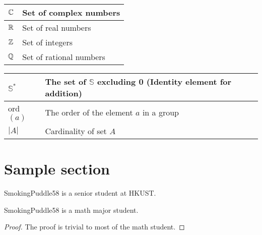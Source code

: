 \documentclass{article}
\begin{document}
\begin{center}

    \begin{tabular}{|l|l|}
        \hline
        $\mathbb{C}$ & Set of complex numbers \\ \hline
        $\mathbb{R}$ & Set of real numbers \\ \hline
        $\mathbb{Z}$ & Set of integers \\ \hline
        $\mathbb{Q}$ & Set of rational numbers \\ \hline
    \end{tabular}
\end{center}
\begin{center}
    
    \begin{tabular}{|l|l|}
        \hline
        $\mathbb{S}^{*}$ & The set of $\mathbb{S}$ excluding 0 (Identity element for addition) \\ \hline
        ord$(a)$                                       & The order of the element $a$ in a group \\ \hline
        $|A|$                                          & Cardinality of set $A$ \\
        \hline                                                           
    \end{tabular}

\end{center}


\newpage

\tableofcontents

\newpage

\setcounter{section}{-1}

\section{Sample section}

\begin{defbox}
    \begin{definition}[SmokingPuddle58]
        SmokingPuddle58 is a senior student at HKUST.
    \end{definition}
\end{defbox}

\begin{thmbox}
    \begin{theorem}
        SmokingPuddle58 is a math major student.
    \end{theorem}
    \begin{prfbox}
        \begin{proof}
            The proof is trivial to most of the math student.
        \end{proof}
    \end{prfbox}
\end{thmbox}
\end{document}

